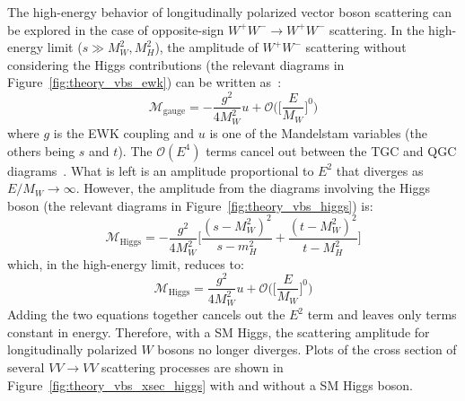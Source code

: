 The high-energy behavior of longitudinally polarized vector boson scattering can be explored in the case of opposite-sign $W^{+}W^{-}\rightarrow W^{+}W^{-}$ scattering.
In the high-energy limit ($s \gg M_W^2, M_H^2$), the amplitude of $W^{+}W^{-}$ scattering without considering the Higgs contributions (the relevant diagrams in Figure~\ref{fig:theory_vbs_ewk}) can be written as~\cite{2009.strong-gauge-boson-scattering}:
\begin{equation}
  \mathcal{M}_{\textrm{gauge}} = -\frac{g^2}{4M_W^2}u+\mathcal{O}\Bigg(\bigg[\frac{E}{M_W}\bigg]^0\Bigg)
  \label{eq:theory_longitudinal_m_gauge}
\end{equation}
where $g$ is the EWK coupling and $u$ is one of the Mandelstam variables (the others being $s$ and $t$).
The $\mathcal{O}(E^4)$ terms cancel out between the TGC and QGC diagrams~\cite{2012.vbs-thesis-oord}.
What is left is an amplitude proportional to $E^2$ that diverges as $E/M_W\rightarrow\infty$.
However, the amplitude from the diagrams involving the Higgs boson (the relevant diagrams in Figure~\ref{fig:theory_vbs_higgs}) is:
\begin{equation}
  \mathcal{M}_{\textrm{Higgs}} = -\frac{g^2}{4M_W^2}\bigg[\frac{(s-M_W^2)^2}{s-m_H^2}+\frac{(t-M_W^2)^2}{t-M_H^2}\bigg]
\end{equation}
which, in the high-energy limit, reduces to:
\begin{equation}
  \mathcal{M}_{\textrm{Higgs}} = \frac{g^2}{4M_W^2}u+\mathcal{O}\Bigg(\bigg[\frac{E}{M_W}\bigg]^0\Bigg)
  \label{eq:theory_longitudinal_m_higgs}
\end{equation}
Adding the two equations together cancels out the $E^2$ term and leaves only terms constant in energy.
Therefore, with a SM Higgs, the scattering amplitude for longitudinally polarized $W$ bosons no longer diverges.
Plots of the cross section of several $VV\rightarrow VV$ scattering processes are shown in Figure~\ref{fig:theory_vbs_xsec_higgs} with and without a SM Higgs boson.

